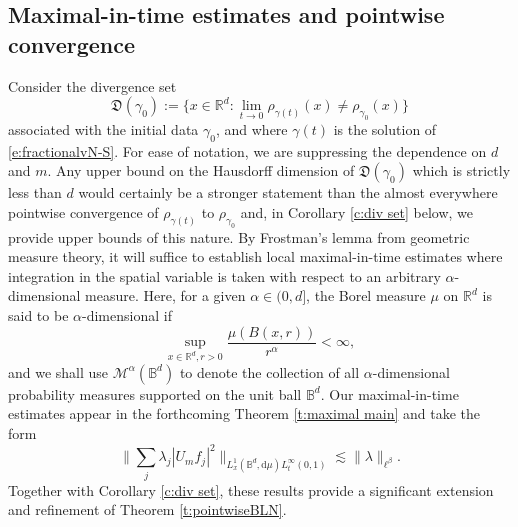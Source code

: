 \documentclass[a4paper]{amsart}
\numberwithin{equation}{section}%
\theoremstyle{plain}%
\theoremstyle{definition}
\theoremstyle{remark}%
\def\d{\mathrm{d}}
\newcommand{\R}{{\mathbb R}}
\begin{document}
\subsection{Maximal-in-time estimates and pointwise convergence} \label{subsection:maximalintime}



Consider the divergence set 
\[
\mathfrak{D}(\gamma_0)
:=
\{x\in \mathbb R^d:\lim_{t\to 0}\rho_{\gamma(t)}(x)\not=\rho_{\gamma_0}(x)\}
\]
associated with the initial data $\gamma_0$, and where $\gamma(t)$ is the solution of \eqref{e:fractionalvN-S}. For ease of notation, we are suppressing the dependence on $d$ and $m$. Any upper bound on the Hausdorff dimension of $\mathfrak{D}(\gamma_0)$ which is strictly less than $d$ would certainly be a stronger statement than the almost everywhere pointwise convergence of $\rho_{\gamma(t)}$ to $\rho_{\gamma_0}$ and, in Corollary \ref{c:div set} below, we provide upper bounds of this nature. By Frostman's lemma from geometric measure theory, it will suffice to establish local maximal-in-time estimates where integration in the spatial variable is taken with respect to an arbitrary $\alpha$-dimensional measure. Here, for a given $\alpha\in(0,d]$, the Borel measure $\mu$ on $\R^d$ is said to be $\alpha$-dimensional if 
\[
\sup_{x\in\R^d, r>0}\frac{\mu(B(x,r))}{r^\alpha}<\infty,
\]
and we shall use $\mathcal M^\alpha(\mathbb B^d)$ to denote the collection of all $\alpha$-dimensional probability measures supported on
the unit ball $\mathbb B^d$. Our maximal-in-time estimates appear in the forthcoming Theorem \ref{t:maximal main} and take the form
\begin{equation}\label{maximal}
            \bigg\|\sum_j\lambda_j|U_m f_j|^2\bigg\|_{L_x^1(\mathbb B^d,\d\mu)L_t^\infty(0,1)}
            \lesssim
            \|\lambda\|_{\ell^\beta}.
        \end{equation}
Together with Corollary \ref{c:div set}, these results provide a significant extension and refinement of Theorem \ref{t:pointwiseBLN}.
\end{document}
